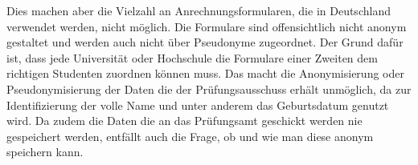 Dies machen aber die Vielzahl an Anrechnungsformularen, die in Deutschland verwendet werden, nicht möglich. Die Formulare sind offensichtlich nicht anonym gestaltet und werden auch nicht über Pseudonyme zugeordnet. Der Grund dafür ist, dass jede Universität oder Hochschule die Formulare einer Zweiten dem richtigen Studenten zuordnen können muss. Das macht die Anonymisierung oder Pseudonymisierung der Daten die der Prüfungsausschuss erhält unmöglich, da zur Identifizierung der volle Name und unter anderem das Geburtsdatum genutzt wird. Da zudem die Daten die an das Prüfungsamt geschickt werden nie gespeichert werden, entfällt auch die Frage, ob und wie man diese anonym speichern kann.
